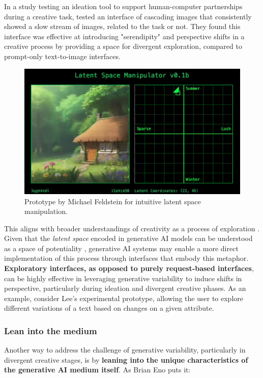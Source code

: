 In a study testing an ideation tool to support human-computer partnerships during a creative task, \cite{Koch2020-gx} tested an interface of cascading images that consistently showed a slow stream of images, related to the task or not. They found this interface was effective at introducing "serendipity" and perspective shifts in a creative process by providing a space for divergent exploration, compared to prompt-only text-to-image interfaces.

\begin{figure}[H]
\centering
\includegraphics[width=0.8\linewidth]{latentspacemanip.png}
\caption{Prototype by Michael Feldstein for intuitive latent space manipulation.}
\label{fig:feldstein}
\end{figure}

This aligns with broader understandings of creativity as a process of exploration \cite{Boden1998-yn, Wiggins2019-yj}. Given that the \textit{latent space} encoded in generative AI models can be understood as a space of potentiality \cite{Schaerf2024-gf}, generative AI systems may enable a more direct implementation of this process through interfaces that embody this metaphor. \textbf{Exploratory interfaces, as opposed to purely request-based interfaces}, can be highly effective in leveraging generative variability to induce shifts in perspective, particularly during ideation and divergent creative phases. As an example, consider Lee's experimental prototype, allowing the user to explore different variations of a text based on changes on a given attribute. 

\subsubsection{Lean into the medium}

Another way to address the challenge of generative variability, particularly in divergent creative stages, is by \textbf{leaning into the unique characteristics of the generative AI medium itself}. As Brian Eno puts it:


